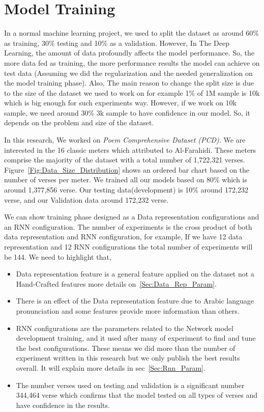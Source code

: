 \clearpage

\section{Model Training}
In a normal machine learning project, we used to split the dataset as around 60\% as training, 30\% testing and 10\% as a validation. However, In The Deep Learning, the amount of data profoundly affects the model performance. So, the more data fed as training, the more performance results the model can achieve on test data (Assuming we did the regularization and the needed generalization on the model training phase). Also, The main reason to change the split size is due to the size of the dataset we used to work on for example 1\% of 1M sample is 10k which is big enough for such experiments way. However, if we work on 10k sample, we need around 30\% 3k sample to have confidence in our model. So, it depends on the problem and size of the dataset.

In this research, We worked on \textit{Poem Comprehensive Dataset (PCD)}\cite{ArabicpoetryDS}. We are interested in the 16 classic meters which attributed to Al-Farahidi. These meters comprise the majority of the dataset with a total number of 1,722,321 verses. Figure~\ref{Fig:Data_Size_Distribution} shows an ordered bar chart based on the number of verses per meter. We trained all our models based on 80\% which is around 1,377,856 verse. Our testing data(development) is 10\% around 172,232 verse, and our Validation data around 172,232 verse.

We can show training phase designed as a Data representation configurations and an RNN configuration. The number of experiments is the cross product of both data representation and RNN configuration, for example, If we have 12 data representation and 12 RNN configurations the total number of experiments will be 144. We need to highlight that,

\begin{itemize}
  \item Data representation feature is a general feature applied on the dataset not a Hand-Crafted features more details on~\ref{Sec:Data_Rep_Param}.
  \item There is an effect of the Data representation feature due to Arabic language pronunciation and some features provide more information than others.
  \item RNN configurations are the parameters related to the Network model development training, and it used after many of experiment to find and tune the best configurations. These means we did more than the number of experiment written in this research but we only publish the best results overall. It will explain more details in sec~\ref{Sec:Rnn_Param}.
  \item The number verses used on testing and validation is a significant number 344,464 verse which confirms that the model tested on all types of verses and have confidence in the results.

\end{itemize}

